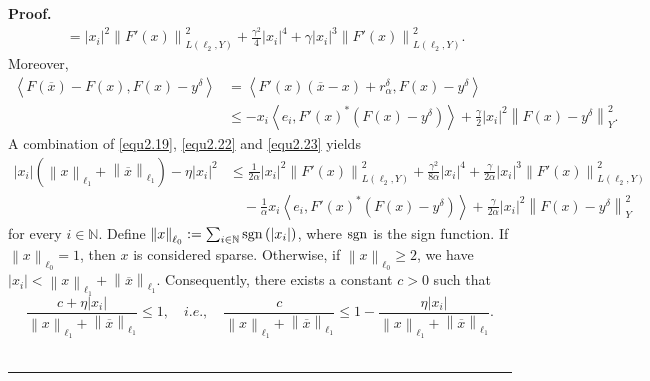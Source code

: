 \documentclass[a4paper,12pt]{article}
\numberwithin{equation}{section}
\newenvironment{proof}[1][Proof]{\textbf{#1.} }
{\ \rule{0.75em}{0.75em}\smallskip}
\begin{document}
\begin{proof}
\begin{align}
        & = \left|x_{i}\right|^{2}\left\|F'\left(x\right)\right\|_{L\left(\ell_{2}, Y\right)}^{2}+\frac{\gamma^{2}}{4}\left|x_{i}\right|^{4}+ \gamma\left|x_{i}\right|^{3}\left\|F'\left(x\right)\right\|_{L\left(\ell_{2}, Y\right)}^{2}.
    \end{align}
    Moreover,
    \begin{align}\label{equ2.23}
        \left<F\left(\overline{x}\right)-F\left(x\right), F\left(x\right)-y^{\delta}\right>
        & = \left<F'\left(x\right)\left(\overline{x}-x\right) +r_{\alpha}^{\delta}, F\left(x\right)-y^{\delta}\right> \nonumber\\
        & \leq -x_{i}\left<e_{i}, F'\left(x\right)^{*}\left(F\left(x\right) -y^{\delta}\right)\right>+\frac{\gamma}{2}\left|x_{i}\right|^{2} \left\|F\left(x\right)-y^{\delta}\right\|_{Y}^{2}.
    \end{align}
    A combination of \eqref{equ2.19}, \eqref{equ2.22} and \eqref{equ2.23} yields
    \begin{align}\label{equ2.24}
        \left|x_{i}\right|\left(\left\|x\right\|_{\ell_{1}}+ \left\|\overline{x}\right\|_{\ell_{1}}\right)-\eta\left|x_{i}\right|^{2}
        & \leq \frac{1}{2\alpha}\left|x_{i}\right|^{2}\left\|F'\left(x\right) \right\|_{L\left(\ell_{2},Y\right)}^{2}+\frac{\gamma^{2}}{8\alpha} \left|x_{i}\right|^{4}+\frac{\gamma}{2\alpha}\left|x_{i}\right|^{3} \left\|F'\left(x\right)\right\|_{L\left(\ell_{2}, Y\right)}^{2}  \nonumber\\
        &  \quad -\frac{1}{\alpha}x_{i}\left<e_{i},F'\left(x\right)^{*} \left(F\left(x\right)-y^{\delta}\right)\right>+ \frac{\gamma}{2\alpha} \left|x_{i}\right|^{2}\left\|F\left(x\right)-y^{\delta}\right\|_{Y}^{2}
    \end{align}
    for every $i\in\mathbb{N}$. Define $\left\|x\right\|_{\ell_{0}}:=\sum_{i\in\mathbb{N}}{\rm sgn}\left(\left|x_{i}\right| \right)$, where ${\rm sgn}$ is the sign function. If $\left\|x\right\|_{\ell_{0}}=1$, then $x$ is considered sparse. Otherwise, if $\left\|x\right\|_{\ell_{0}}\geq 2$, we have $\left|x_{i}\right|< \left\|x\right\|_{\ell_{1}}+\left\|\overline{x}\right\|_{\ell_{1}}$. Consequently, there exists a constant $c>0$ such that
    \begin{equation}\label{equ2.25}
        \frac{c+\eta\left|x_{i}\right|}{\left\|x\right\|_{\ell_{1}}+ \left\|\overline{x}\right\|_{\ell_{1}}}\leq 1, \quad i.e., \quad \frac{c}{\left\|x\right\|_{\ell_{1}}+ \left\|\overline{x}\right\|_{\ell_{1}}} \leq 1-\frac{\eta\left|x_{i}\right|}{\left\|x\right\|_{\ell_{1}}+ \left\|\overline{x}\right\|_{\ell_{1}}}.

\end{equation}
\end{proof}
\end{document}
